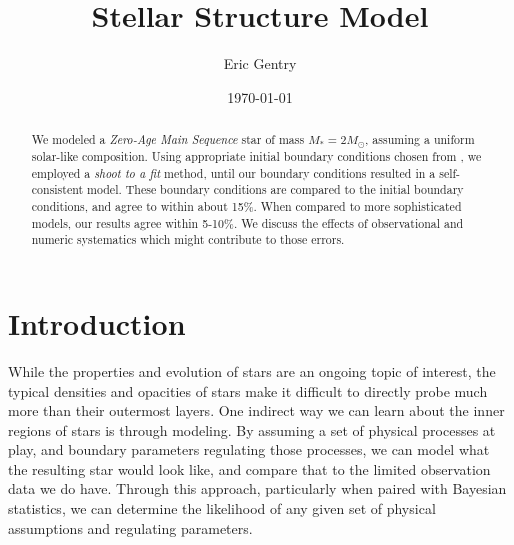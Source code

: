 \usepackage{graphics}      %
\usepackage{graphicx}      %
\usepackage{epsf}          %
\usepackage{epstopdf}
\usepackage{bm}            %
\usepackage{float}

\usepackage{amsmath,graphicx,amssymb}
\usepackage[colorlinks=true]{hyperref}  %

\hypersetup{linkcolor=black, citecolor=blue, filecolor=black, urlcolor=black}


%
%


\title{Stellar Structure Model}
\author{Eric Gentry}
\date{ \today }
 
\begin{abstract}
We modeled a \emph{Zero-Age Main Sequence} star of mass $M_\ast = 2 M_\odot$, assuming a uniform solar-like composition.  Using appropriate initial boundary conditions chosen from \cite{Hansen}, we employed a \emph{shoot to a fit} method, until our boundary conditions resulted in a self-consistent model.  These boundary conditions are compared to the initial boundary conditions, and agree to within about 15\%.  When compared to more sophisticated models, our results agree within 5-10\%. We discuss the effects of observational and numeric systematics which might contribute to those errors.
\end{abstract}

\maketitle



\section{Introduction}
\label{sec:introduction}
While the properties and evolution of stars are an ongoing topic of interest, the typical densities and opacities of stars make it difficult to directly probe much more than their outermost layers.  One indirect way we can learn about the inner regions of stars is through modeling.  By assuming a set of physical processes at play, and boundary parameters regulating those processes, we can model what the resulting star would look like, and compare that to the limited observation data we do have.  Through this approach, particularly when paired with Bayesian statistics, we can determine the likelihood of any given set of physical assumptions and regulating parameters.

